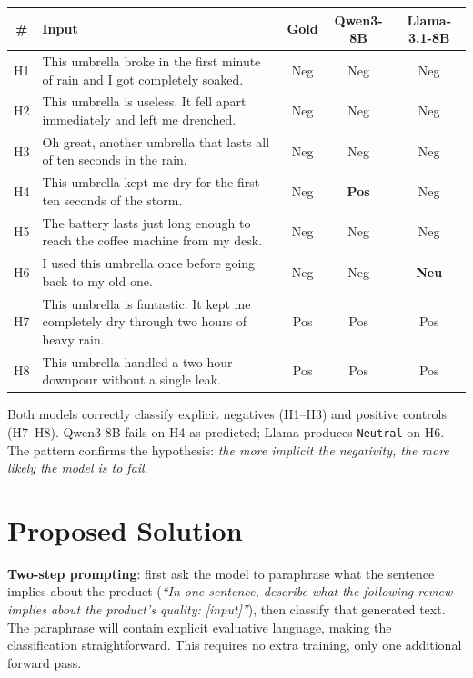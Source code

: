 \documentclass[11pt,a4paper]{article}
\begin{document}
\begin{table}[h!]
\centering
\small
\begin{tabularx}{\textwidth}{c L{7cm} c c c}
\toprule
\# & Input & Gold & Qwen3-8B & Llama-3.1-8B \\
\midrule
H1 & This umbrella broke in the first minute of rain and I got completely soaked.
   & Neg & Neg & Neg \\
H2 & This umbrella is useless. It fell apart immediately and left me drenched.
   & Neg & Neg & Neg \\
H3 & Oh great, another umbrella that lasts all of ten seconds in the rain.
   & Neg & Neg & Neg \\
H4 & This umbrella kept me dry for the first ten seconds of the storm.
   & Neg & \textbf{Pos} & Neg \\
H5 & The battery lasts just long enough to reach the coffee machine from my desk.
   & Neg & Neg & Neg \\
H6 & I used this umbrella once before going back to my old one.
   & Neg & Neg & \textbf{Neu} \\
H7 & This umbrella is fantastic. It kept me completely dry through two hours of heavy rain.
   & Pos & Pos & Pos \\
H8 & This umbrella handled a two-hour downpour without a single leak.
   & Pos & Pos & Pos \\
\bottomrule
\end{tabularx}
\end{table}

Both models correctly classify explicit negatives (H1--H3) and positive controls
(H7--H8). Qwen3-8B fails on H4 as predicted; Llama produces \texttt{Neutral} on
H6. The pattern confirms the hypothesis: \emph{the more implicit the negativity,
the more likely the model is to fail}.

\section*{Proposed Solution}

\textbf{Two-step prompting}: first ask the model to paraphrase what the sentence
implies about the product (\emph{``In one sentence, describe what the following
review implies about the product's quality: [input]''}), then classify that
generated text. The paraphrase will contain explicit evaluative language, making
the classification straightforward. This requires no extra training, only one
additional forward pass.
\end{document}
